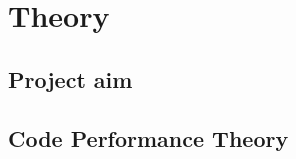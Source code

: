 \chapter{Theory}
\label{chapter2}

\section{Project aim}
\lipsum[1-1] \cite{aron2009mandelbulb}

\section{Code Performance Theory}
